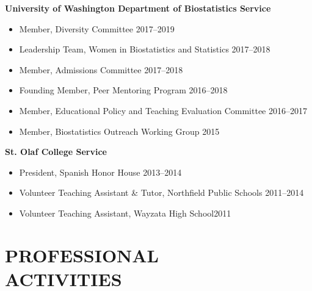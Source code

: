 \documentclass[margin]{res}
\begin{document}
\begin{resume}
\textbf{University of Washington Department of Biostatistics Service}
\begin{itemize} %
	\item Member, Diversity Committee \hfill 2017--2019
	\item Leadership Team, Women in Biostatistics and Statistics \hfill 2017--2018
	\item Member, Admissions Committee \hfill 2017--2018
	\item Founding Member, Peer Mentoring Program \hfill 2016--2018
	\item Member, Educational Policy and Teaching Evaluation Committee \hfill 2016--2017
	\item Member, Biostatistics Outreach Working Group \hfill 2015%
\end{itemize}

\textbf{St. Olaf College Service}
\begin{itemize}
			\item President, Spanish Honor House \hfill 2013--2014
			\item Volunteer Teaching Assistant \& Tutor, Northfield Public Schools \hfill 2011--2014
			\item Volunteer Teaching Assistant, Wayzata High School\hfill 2011 \\
\end{itemize}

\section{PROFESSIONAL \\ ACTIVITIES}  


\end{resume}
\end{document}
